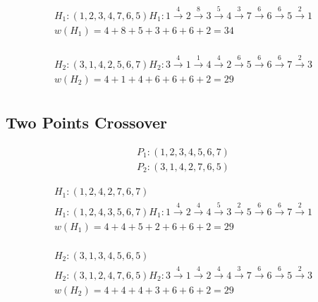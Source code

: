 \documentclass{article}
\begin{document}
\begin{equation*}
  \begin{split}
    H_1: (\boxed{1,2,3,4},7,6,5) H_1: 1 \overset{4}{\rightarrow} 2 \overset{8}{\rightarrow} 3 \overset{5}{\rightarrow} 4 \overset{3}{\rightarrow} 7 \overset{6}{\rightarrow} 6 \overset{6}{\rightarrow} 5 \overset{2}{\rightarrow} 1\\
    w(H_1) = 4 + 8 + 5 + 3 + 6 + 6 + 2 = 34\\
  \end{split}
\end{equation*}

\begin{equation*}
  \begin{split}
    H_2: (\boxed{3,1,4,2},5,6,7) H_2: 3 \overset{4}{\rightarrow} 1 \overset{1}{\rightarrow} 4 \overset{4}{\rightarrow} 2 \overset{6}{\rightarrow} 5 \overset{6}{\rightarrow} 6 \overset{6}{\rightarrow} 7 \overset{2}{\rightarrow} 3\\
    w(H_2) = 4 + 1 + 4 + 6 + 6 + 6 + 2 = 29\\
  \end{split}
\end{equation*}

\subsection{Two Points Crossover}
\begin{equation*}
  \begin{split}
    P_1: (1,2,\boxed{3,4,5},6,7)\\
    P_2: (3,1,\boxed{4,2,7},6,5)
  \end{split}
\end{equation*}

\begin{equation*}
  \begin{split}
    H_1: (1,2,\boxed{4,2,7},6,7)\\
    H_1: (1,2,4,3,5,6,7) H_1: 1 \overset{4}{\rightarrow} 2 \overset{4}{\rightarrow} 4 \overset{5}{\rightarrow} 3 \overset{2}{\rightarrow} 5 \overset{6}{\rightarrow} 6 \overset{6}{\rightarrow} 7 \overset{2}{\rightarrow} 1\\
    w(H_1) = 4 + 4 + 5 + 2 + 6 + 6 + 2 = 29\\
  \end{split}
\end{equation*}

\begin{equation*}
  \begin{split}
    H_2: (3,1,\boxed{3,4,5},6,5)\\
    H_2: (3,1,2,4,7,6,5) H_2: 3 \overset{4}{\rightarrow} 1 \overset{4}{\rightarrow} 2 \overset{4}{\rightarrow} 4 \overset{3}{\rightarrow} 7 \overset{6}{\rightarrow} 6 \overset{6}{\rightarrow} 5 \overset{2}{\rightarrow} 3\\
    w(H_2) = 4 + 4 + 4 + 3 + 6 + 6 + 2 = 29\\
  \end{split}
\end{equation*}
\end{document}
